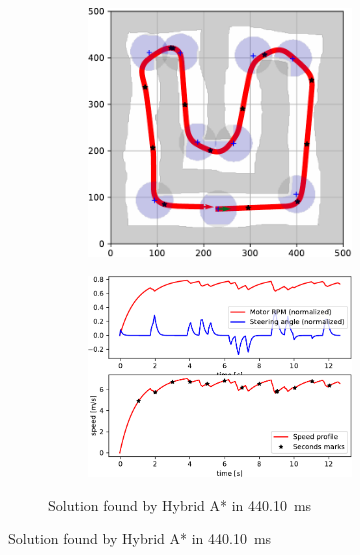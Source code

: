 \begin{figure}[!tbp]%
	\centering

	\begin{subfigure}[t]{\textwidth}
		\begin{subfigure}[t]{0.45\textwidth}
			\includegraphics[width=\textwidth]{../img/experiments/u-hybrid_astar-trajectory}
		\end{subfigure}
		\hfill
		\begin{subfigure}[t]{0.45\textwidth}
			\includegraphics[width=\textwidth]{../img/experiments/u-hybrid_astar-actuators}
		\end{subfigure}	
		\caption{Solution found by Hybrid A* in \SI{440.10}{\milli\second}}
		\label{fig:u-hybrid_astar}
	\end{subfigure}


\end{figure}
